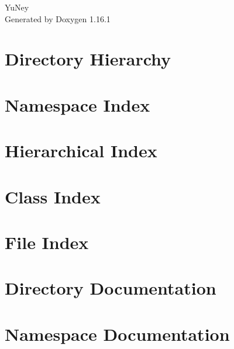 \documentclass[twoside]{book}
\newcommand{\+}{\discretionary{\mbox{\scriptsize$\hookleftarrow$}}{}{}}
\newcommand{\clearemptydoublepage}{%
    \newpage{\pagestyle{empty}\cleardoublepage}%
  }
\begin{document}
  \raggedbottom
    \hypersetup{pageanchor=false,
                bookmarksnumbered=true,
                pdfencoding=unicode
               }
  \begin{titlepage}
  \vspace*{7cm}
  \begin{center}%
  {\Large Yu\+Ney}\\
  \vspace*{1cm}
  {\large Generated by Doxygen 1.16.1}\\
  \end{center}
  \end{titlepage}
  \clearemptydoublepage
  \tableofcontents
  \clearemptydoublepage
  \hypersetup{pageanchor=true}

\chapter{Directory Hierarchy}

\chapter{Namespace Index}

\chapter{Hierarchical Index}

\chapter{Class Index}

\chapter{File Index}

\chapter{Directory Documentation}








\chapter{Namespace Documentation}








\end{document}
